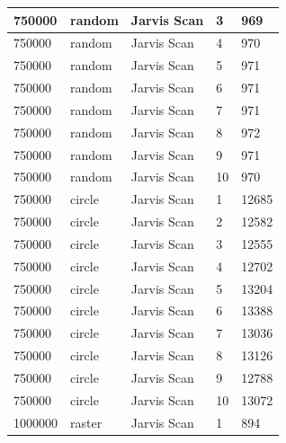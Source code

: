 \documentclass[12pt]{article}
\begin{document}
\begin{longtable}{|l|l|l|l|l|}
750000       & random            & Jarvis Scan & 3          & 969                           \\ \hline
750000       & random            & Jarvis Scan & 4          & 970                           \\ \hline
750000       & random            & Jarvis Scan & 5          & 971                           \\ \hline
750000       & random            & Jarvis Scan & 6          & 971                           \\ \hline
750000       & random            & Jarvis Scan & 7          & 971                           \\ \hline
750000       & random            & Jarvis Scan & 8          & 972                           \\ \hline
750000       & random            & Jarvis Scan & 9          & 971                           \\ \hline
750000       & random            & Jarvis Scan & 10         & 970                           \\ \hline
750000       & circle            & Jarvis Scan & 1          & 12685                         \\ \hline
750000       & circle            & Jarvis Scan & 2          & 12582                         \\ \hline
750000       & circle            & Jarvis Scan & 3          & 12555                         \\ \hline
750000       & circle            & Jarvis Scan & 4          & 12702                         \\ \hline
750000       & circle            & Jarvis Scan & 5          & 13204                         \\ \hline
750000       & circle            & Jarvis Scan & 6          & 13388                         \\ \hline
750000       & circle            & Jarvis Scan & 7          & 13036                         \\ \hline
750000       & circle            & Jarvis Scan & 8          & 13126                         \\ \hline
750000       & circle            & Jarvis Scan & 9          & 12788                         \\ \hline
750000       & circle            & Jarvis Scan & 10         & 13072                         \\ \hline
1000000      & raster            & Jarvis Scan & 1          & 894                           \\ \hline

\end{longtable}
\end{document}
